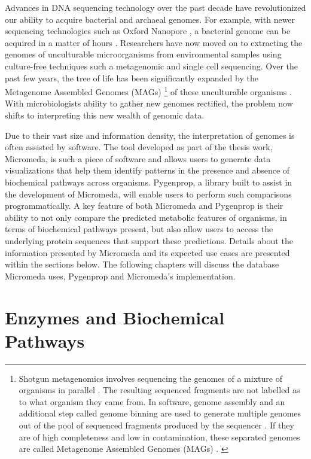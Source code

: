 Advances in DNA sequencing technology over the past decade have revolutionized our ability to acquire bacterial and archaeal genomes. For example, with newer sequencing technologies such as Oxford Nanopore \cite{jain2016oxford}, a bacterial genome can be acquired in a matter of hours \cite{Lu2016,Cao2017}. Researchers have now moved on to extracting the genomes of unculturable microorganisms from environmental samples using culture-free techniques such a metagenomic \cite{quince2017shotgun} and single cell \cite{gawad2016single} sequencing. Over the past few years, the tree of life has been significantly expanded by the Metagenome Assembled Genomes (MAGs) \footnote{Shotgun metagenomics involves sequencing the genomes of a mixture of organisms in parallel \cite{quince2017shotgun}. The resulting sequenced fragments are not labelled as to what organism they came from. In software, genome assembly and an additional step called genome binning are used to generate multiple genomes out of the pool of sequenced fragments produced by the sequencer \cite{quince2017shotgun, sangwan2016recovering}. If they are of high completeness and low in contamination, these separated genomes are called Metagenome Assembled Genomes (MAGs)  \cite{sangwan2016recovering}. \label{metagenomics-footnote}} of these unculturable organisms \cite{Hug2016,Parks2017}. With microbiologists ability to gather new genomes rectified, the problem now shifts to interpreting this new wealth of genomic data.

Due to their vast size and information density, the interpretation of genomes is often assisted by software. The tool developed as part of the thesis work, Micromeda, is such a piece of software and allows users to generate data visualizations that help them identify patterns in the presence and absence of biochemical pathways across organisms. Pygenprop, a library built to assist in the development of Micromeda, will enable users to perform such comparisons programmatically. A key feature of both Micromeda and Pygenprop is their ability to not only compare the predicted metabolic features of organisms, in terms of biochemical pathways present, but also allow users to access the underlying protein sequences that support these predictions. Details about the information presented by Micromeda and its expected use cases are presented within the sections below. The following chapters will discuss the database Micromeda uses, Pygenprop and Micromeda's implementation.

\section{Enzymes and Biochemical Pathways} \label{enzymes-and-pathways} 

